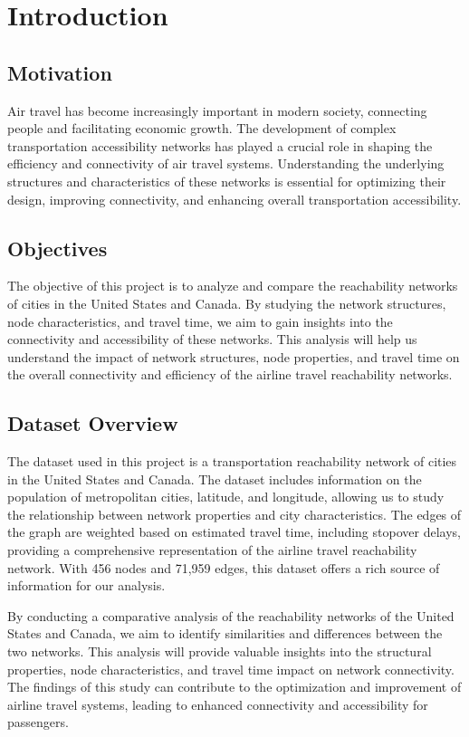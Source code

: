 \section{Introduction}

\subsection{Motivation}

Air travel has become increasingly important in modern society, connecting people and facilitating economic growth. The development of complex transportation accessibility networks has played a crucial role in shaping the efficiency and connectivity of air travel systems. Understanding the underlying structures and characteristics of these networks is essential for optimizing their design, improving connectivity, and enhancing overall transportation accessibility.

\subsection{Objectives}

The objective of this project is to analyze and compare the reachability networks of cities in the United States and Canada. By studying the network structures, node characteristics, and travel time, we aim to gain insights into the connectivity and accessibility of these networks. This analysis will help us understand the impact of network structures, node properties, and travel time on the overall connectivity and efficiency of the airline travel reachability networks.

\subsection{Dataset Overview}

The dataset used in this project is a transportation reachability network of cities in the United States and Canada. The dataset includes information on the population of metropolitan cities, latitude, and longitude, allowing us to study the relationship between network properties and city characteristics. The edges of the graph are weighted based on estimated travel time, including stopover delays, providing a comprehensive representation of the airline travel reachability network. With 456 nodes and 71,959 edges, this dataset offers a rich source of information for our analysis.

By conducting a comparative analysis of the reachability networks of the United States and Canada, we aim to identify similarities and differences between the two networks. This analysis will provide valuable insights into the structural properties, node characteristics, and travel time impact on network connectivity. The findings of this study can contribute to the optimization and improvement of airline travel systems, leading to enhanced connectivity and accessibility for passengers.